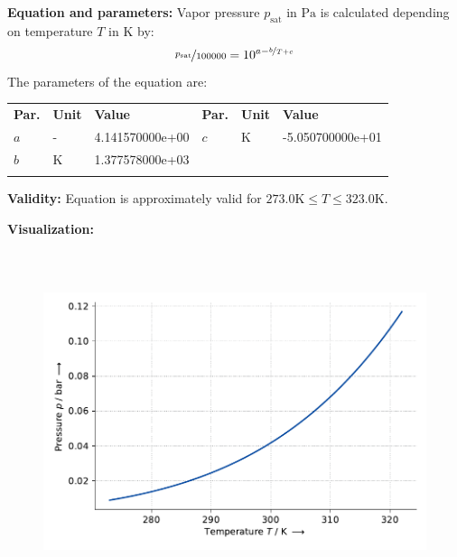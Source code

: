 \textbf{Equation and parameters:}
\newline
%
Vapor pressure $p_\mathrm{sat}$ in $\si{\pascal}$ is calculated depending on temperature $T$ in $\si{\kelvin}$ by:
%
\begin{equation*}
\nicefrac{p_\mathrm{sat}}{100000} = 10^{a - \nicefrac{b}{T + c}}
\end{equation*}
%
The parameters of the equation are:
%
\begin{longtable}[l]{lll|lll}
\toprule
\addlinespace
\textbf{Par.} & \textbf{Unit} & \textbf{Value} &	\textbf{Par.} & \textbf{Unit} & \textbf{Value} \\
\addlinespace
\midrule
\endhead

\bottomrule
\endfoot
\bottomrule
\endlastfoot
\addlinespace

$a$ & - & 4.141570000e+00 & $c$ & $\si{\kelvin}$  & -5.050700000e+01 \\
$b$ & $\si{\kelvin}$ & 1.377578000e+03 & & & \\

\addlinespace\end{longtable}

\textbf{Validity:}
\newline
Equation is approximately valid for $273.0 \si{\kelvin} \leq T \leq 323.0 \si{\kelvin}$.
\newline

\textbf{Visualization:}
%
\begin{figure}[!htp]
{\noindent\includegraphics[height=10cm, keepaspectratio]{figs/ref/ref_Toluene_VaporPressure_Antoine_5.pdf}}
\end{figure}
%

